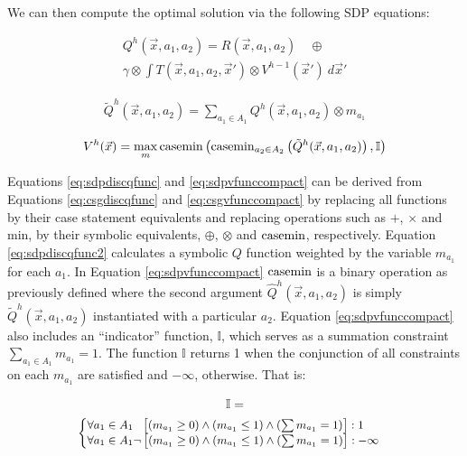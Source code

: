 We can then compute the optimal solution via the following SDP equations:

{\footnotesize 
\abovedisplayskip=0pt
\belowdisplayskip=0pt
\begin{multline}
\label{eq:sdpdiscqfunc}
  Q^{h}(\vec{x}, a_1, a_2) = R(\vec{x}, a_1, a_2) \quad \oplus \\
  \gamma \otimes \int T(\vec{x}, a_1, a_2, \vec{x}') \otimes V^{h-1}(\vec{x}')\ d\vec{x}' 
\end{multline}
}%

{\footnotesize 
\abovedisplayskip=0pt
\belowdisplayskip=0pt
\begin{multline}
\label{eq:sdpdiscqfunc2}
  \tilde{Q}^{h}(\vec{x}, a_1, a_2) = \sum_{a_1 \in A_1} Q^{h}(\vec{x}, a_1, a_2) \otimes m_{a_{1}}
\end{multline}
}%

{\footnotesize 
\abovedisplayskip=0pt
\belowdisplayskip=0pt
\begin{multline}
\label{eq:sdpvfunccompact}
  V^{h}(\vec{x}) = \max_{m} 
\casemin \left( \casemin_{a_2 \in A_2} \left( 
\tilde{Q}^{h}(\vec{x}, a_1, a_2)
\right)  
, \mathbb{I} \right)
\end{multline}
}%

Equations \eqref{eq:sdpdiscqfunc} and \eqref{eq:sdpvfunccompact} can
be derived from Equations \eqref{eq:csgdiscqfunc} and \eqref{eq:csgvfunccompact}
by replacing all functions by their case statement equivalents and replacing
operations such as $+$, $\times$ and min, by their symbolic equivalents,
$\oplus$, $\otimes$ and $\mathrm{casemin}$, respectively. Equation \eqref{eq:sdpdiscqfunc2}
calculates a symbolic $Q$ function weighted 
by the variable $m_{a_{1}}$ for each $a_1$. In Equation \eqref{eq:sdpvfunccompact} 
$\mathrm{casemin}$ is a binary operation as previously defined where the
second argument $\hat{Q}^{h}(\vec{x}, a_1, a_2)$ is simply
$\tilde{Q}^{h}(\vec{x}, a_1, a_2)$ instantiated with a particular $a_2$.
Equation \eqref{eq:sdpvfunccompact} 
also includes an ``indicator'' function, $\mathbb{I}$, which serves as a summation constraint 
$\sum_{a_{1} \in A_1} m_{a_{1}} = 1$. The function $\mathbb{I}$
returns 1 when the conjunction of all constraints on each $m_{a_1}$ are satisfied
and $-\infty$, otherwise. That is:

\vspace{-2.5mm}
{\small 
\abovedisplayskip=0pt
\belowdisplayskip=0pt
\begin{multline*}
  \mathbb{I} = \\
  {\footnotesize
    \begin{cases}
      \forall a_{1} \in A_1 \hspace{6pt}\left[(m_{a_{1}} \geq 0) \wedge (m_{a_{1}} \leq 1 ) \wedge (\sum m_{a_{1}} = 1) \right]: 1 \\ 
      \forall a_{1} \in A_1 \neg \left[(m_{a_{1}} \geq 0) \wedge (m_{a_{1}} \leq 1 ) \wedge (\sum m_{a_{1}} = 1) \right]: -\infty \\ 
    \end{cases} \nonumber
   }
\end{multline*}
}%


